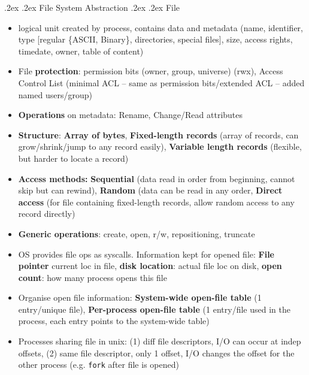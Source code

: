 \documentclass[10pt,landscape,a4paper]{article}
\makeatletter
\renewcommand{\subsection}{\@startsection{subsection}{1}{0mm}%
  {.2ex}%
  {.2ex}%
{\sffamily\bfseries}}
\renewcommand{\subsubsection}{\@startsection{subsubsection}{1}{0mm}%
  {.2ex}%
  {.2ex}%
{\rmfamily\bfseries}}
\makeatother
\begin{document}
\begin{multicols*}{4}
\subsection{File System Abstraction}
\subsubsection{File}
\begin{itemize}
  \item logical unit created by process, contains data and metadata (name, identifier, type [regular \{ASCII, Binary\}, directories, special files], size, access rights, timedate, owner, table of content)
  \item File \textbf{protection}: permission bits (owner, group, universe) (rwx), Access Control List (minimal ACL -- same as permission bits/extended ACL -- added named users/group)
  \item \textbf{Operations} on metadata: Rename, Change/Read attributes
  \item \textbf{Structure}: \textbf{Array of bytes}, \textbf{Fixed-length records} (array of records, can grow/shrink/jump to any record easily), \textbf{Variable length records} (flexible, but harder to locate a record)
  \item \textbf{Access methods:} \textbf{Sequential} (data read in order from beginning, cannot skip but can rewind), \textbf{Random} (data can be read in any order, \textbf{Direct access} (for file containing fixed-length records, allow random access to any record directly)
  \item \textbf{Generic operations}: create, open, r/w, repositioning, truncate
  \item OS provides file ops as syscalls. Information kept for opened file: \textbf{File pointer} current loc in file, \textbf{disk location}: actual file loc on disk, \textbf{open count}: how many process opens this file
  \item Organise open file information: \textbf{System-wide open-file table} (1 entry/unique file), \textbf{Per-process open-file table} (1 entry/file used in the process, each entry points to the system-wide table)
  \item Processes sharing file in unix: (1) diff file descriptors, I/O can occur at indep offsets, (2) same file descriptor, only 1 offset, I/O changes the offset for the other process (e.g. \texttt{fork} after file is opened)
\end{itemize}

\end{multicols*}
\end{document}

